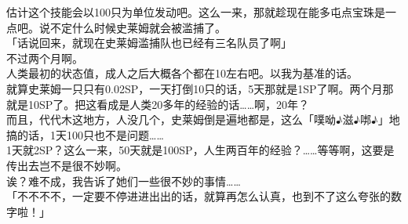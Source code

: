 估计这个技能会以100只为单位发动吧。这么一来，那就趁现在能多屯点宝珠是一点吧。说不定什么时候史莱姆就会被滥捕了。\\

「话说回来，就现在史莱姆滥捕队也已经有三名队员了啊」\\

不过两个月啊。\\

人类最初的状态值，成人之后大概各个都在10左右吧。以我为基准的话。\\

就算史莱姆一只只有0.02SP，一天打倒10只的话，5天那就是1SP了啊。两个月那就是10SP了。把这看成是人类20多年的经验的话……啊，20年？\\

而且，代代木这地方，人没几个，史莱姆倒是遍地都是，这么「噗呦♪滋♪𠳐♪」地搞的话，1天100只也不是问题……\\

1天就2SP？这么一来，50天就是100SP，人生两百年的经验？……等等啊，这要是传出去岂不是很不妙啊。\\

诶？难不成，我告诉了她们一些很不妙的事情……\\

「不不不不，一定要不停进进出出的话，就算再怎么认真，也到不了这么夸张的数字啦！」\\


